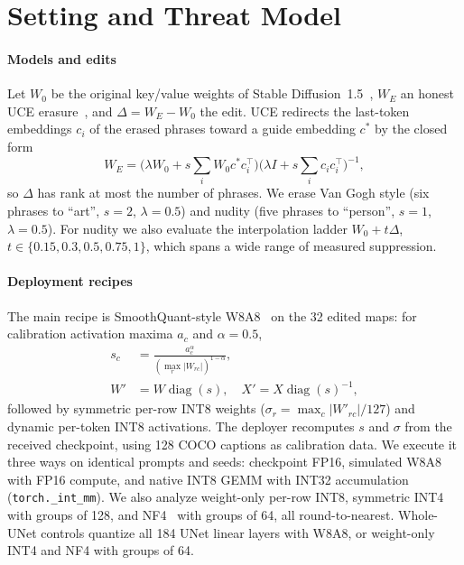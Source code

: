 \section{Setting and Threat Model}
\label{sec:setting}
\paragraph{Models and edits}
Let $W_0$ be the original key/value weights of Stable Diffusion~1.5~\cite{ldm},
$W_E$ an honest UCE erasure~\cite{uce}, and $\Delta=W_E-W_0$ the edit. UCE redirects
the last-token embeddings $c_i$ of the erased phrases toward a guide embedding $c^*$
by the closed form
\begin{equation}
 W_E=\Big(\lambda W_0+s\sum_i W_0c^*c_i^\top\Big)\Big(\lambda I+s\sum_ic_ic_i^\top\Big)^{-1},
\end{equation}
so $\Delta$ has rank at most the number of phrases. We erase Van Gogh style (six
phrases to ``art'', $s{=}2$, $\lambda{=}0.5$) and nudity (five phrases to ``person'',
$s{=}1$, $\lambda{=}0.5$). For nudity we also evaluate the interpolation ladder
$W_0+t\Delta$, $t\in\{0.15,0.3,0.5,0.75,1\}$, which spans a wide range of measured
suppression.

\paragraph{Deployment recipes}
The main recipe is SmoothQuant-style W8A8~\cite{smoothquant} on the 32 edited
maps: for calibration activation maxima $a_c$ and $\alpha=0.5$,
\begin{equation}
\begin{aligned}
 s_c&=\frac{a_c^\alpha}{(\max_r|W_{rc}|)^{1-\alpha}},\\
 W'&=W\operatorname{diag}(s),\quad X'=X\operatorname{diag}(s)^{-1},
\end{aligned}
 \label{eq:smooth}
\end{equation}
followed by symmetric per-row INT8 weights ($\sigma_r=\max_c|W'_{rc}|/127$) and
dynamic per-token INT8 activations. The deployer recomputes $s$ and $\sigma$ from the
received checkpoint, using 128 COCO captions as calibration data. We execute it three
ways on identical prompts and seeds: checkpoint FP16, simulated W8A8 with FP16
compute, and native INT8 GEMM with INT32 accumulation (\texttt{torch.\_int\_mm}). We
also analyze weight-only per-row INT8, symmetric INT4 with groups of 128, and
NF4~\cite{qlora} with groups of 64, all round-to-nearest. Whole-UNet controls quantize all
184 UNet linear layers with W8A8, or weight-only INT4 and NF4 with groups of 64.

